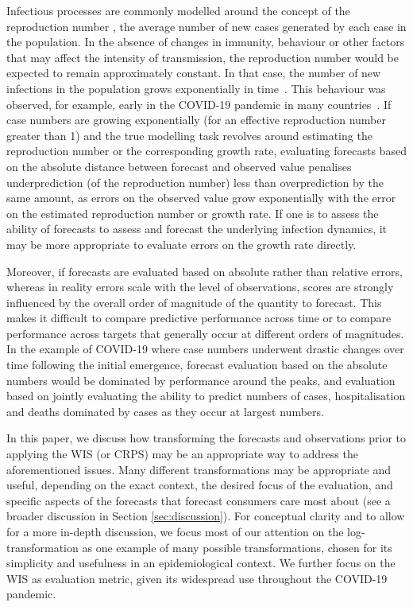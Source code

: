 \documentclass{article}
\begin{document}
Infectious processes are commonly modelled around the concept of the reproduction number \citep{gosticPracticalConsiderationsMeasuring2020}, the average number of new cases generated by each case in the population.
In the absence of changes in immunity, behaviour or other factors that may affect the intensity of transmission, the reproduction number would be expected to remain approximately constant.
In that case, the number of new infections in the population grows exponentially in time~\citep{dushoffSpeedStrengthEpidemic2021}.
This behaviour was observed, for example, early in the COVID-19 pandemic in many countries~\citep{pellisChallengesControlCOVID192021}.
If case numbers are growing exponentially (for an effective reproduction number greater than 1) and the true modelling task revolves around estimating the reproduction number or the corresponding growth rate, evaluating forecasts based on the absolute distance between forecast and observed value penalises underprediction (of the reproduction number) less than overprediction by the same amount, as errors on the observed value grow exponentially with the error on the estimated reproduction number or growth rate.
If one is to assess the ability of forecasts to assess and forecast the underlying infection dynamics, it may be more appropriate to evaluate errors on the growth rate directly.

Moreover, if forecasts are evaluated based on absolute rather than relative errors, whereas in reality errors scale with the level of observations, scores are strongly influenced by the overall order of magnitude of the quantity to forecast.
This makes it difficult to compare predictive performance across time or to compare performance across targets that generally occur at different orders of magnitudes.
In the example of COVID-19 where case numbers underwent drastic changes over time following the initial emergence, forecast evaluation based on the absolute numbers would be dominated by performance around the peaks, and evaluation based on jointly evaluating the ability to predict numbers of cases, hospitalisation and deaths dominated by cases as they occur at largest numbers.

In this paper, we discuss how transforming the forecasts and observations prior to applying the WIS (or CRPS) may be an appropriate way to address the aforementioned issues. Many different transformations may be appropriate and useful, depending on the exact context, the desired focus of the evaluation, and specific aspects of the forecasts that forecast consumers care most about (see a broader discussion in Section \ref{sec:discussion}). For conceptual clarity and to allow for a more in-depth discussion, we focus most of our attention on the log-transformation as one example of many possible transformations, chosen for its simplicity and usefulness in an epidemiological context. We further focus on the WIS as evaluation metric, given its widespread use throughout the COVID-19 pandemic. 
\end{document}
